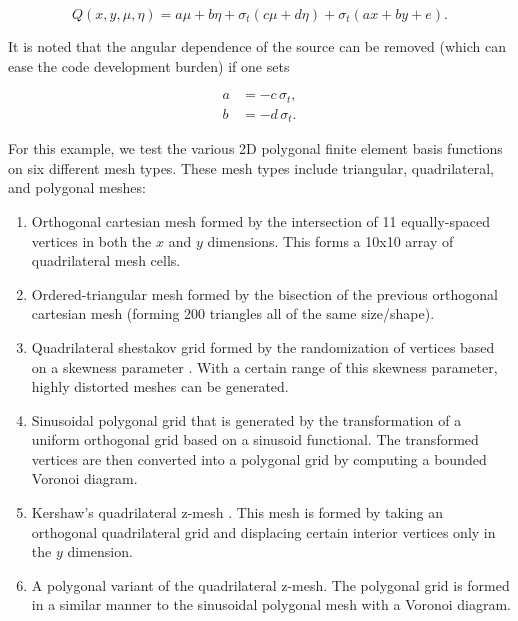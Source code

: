 \begin{equation}
\label{eq::BF_Results_Linear_src}
Q(x,y,\mu,\eta) = a \mu + b \eta + \sigma_t \left(  c \mu + d \eta \right) + \sigma_t \left( ax +by + e   \right).
\end{equation}

\noindent It is noted that the angular dependence of the source can be removed (which can ease the code development burden) if one sets

\begin{equation}
\label{eq::BF_Results_Linear_removeterms}
\begin{aligned}
	a &= - c \, \sigma_t, \\
	b &= - d \, \sigma_t.
\end{aligned}
\end{equation}

For this example, we test the various 2D polygonal finite element basis functions on six different mesh types. These mesh types include triangular, quadrilateral, and polygonal meshes:

\begin{enumerate}
	\item Orthogonal cartesian mesh formed by the intersection of 11 equally-spaced vertices in both the $x$ and $y$ dimensions. This forms a 10x10 array of quadrilateral mesh cells.
	\item Ordered-triangular mesh formed by the bisection of the previous orthogonal cartesian mesh (forming 200 triangles all of the same size/shape).
	\item Quadrilateral shestakov grid formed by the randomization of vertices based on a skewness parameter \cite{shestakov1988solution,shestakov1990test}. With a certain range of this skewness parameter, highly distorted meshes can be generated.
	\item Sinusoidal polygonal grid that is generated by the transformation of a uniform orthogonal grid based on a sinusoid functional. The transformed vertices are then converted into a polygonal grid by computing a bounded Voronoi diagram.
	\item Kershaw's quadrilateral z-mesh \cite{kershaw1981differencing}. This mesh is formed by taking an orthogonal quadrilateral grid and displacing certain interior vertices only in the $y$ dimension.
	\item A polygonal variant of the quadrilateral z-mesh. The polygonal grid is formed in a similar manner to the sinusoidal polygonal mesh with a Voronoi diagram.
\end{enumerate}

